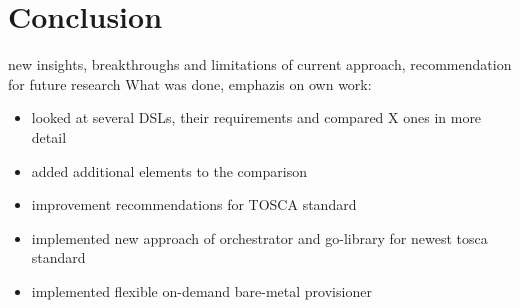 \chapter{Conclusion}



new insights, breakthroughs  and limitations of current approach, recommendation for future research
\newline
What was done, emphazis on own work:

\begin{itemize}
  \item looked at several DSLs, their requirements and compared X ones in more detail
  \item added additional elements to the comparison
  \item improvement recommendations for TOSCA standard
  \item implemented new approach of orchestrator and go-library for newest tosca standard
  \item implemented flexible on-demand bare-metal provisioner
\end{itemize}
